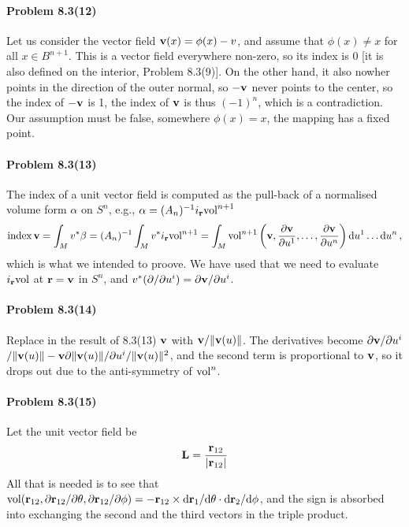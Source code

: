 \documentclass[a4paper,12pt]{article}
\def\d{\mathrm{d}}
\newcommand{\problem}[1]{\paragraph{Problem #1}}
\begin{document}

\problem{8.3(12)} Let us consider the vector field ${\bf v}(x)=\phi(x)-v$, and assume that $\phi(x)\ne x$ for all $x\in B^{n+1}$. This is a vector field everywhere non-zero, so its index is 0 [it is also defined on the interior, Problem 8.3(9)]. On the other hand, it also nowher points in the direction of the outer normal, so $-{\bf v}$ never points to the center, so the index of $-{\bf v}$ is 1, the index of ${\bf v}$ is thus $(-1)^n$, which is a contradiction. Our assumption must be false, somewhere $\phi(x)=x$, the mapping has a fixed point.


\problem{8.3(13)} The index of a unit vector field is computed as the pull-back of a normalised volume form $\alpha$ on $S^n$, e.g., $\alpha = (A_n)^{-1}i_{\bf r}{\rm vol}^{n+1}$
\[
 \mathop{\rm index} {\bf v} = \int_M v^* \beta = (A_n)^{-1}\int_M v^* i_{\bf r}{\rm vol}^{n+1} = \int_M {\rm vol}^{n+1}\left( {\bf v}, \frac{\partial\bf v}{\partial u^1}, \dots,\frac{\partial\bf v}{\partial u^n}\right)\d u^1\dots\d u^n\,,
\]
which is what we intended to proove. We have used that we need to evaluate $i_{\bf r}{\rm vol}$ at ${\bf r} = {\bf v}$ in $S^n$, and $v^*(\partial/\partial u^i) = {\partial\bf v}/\partial u^i$.


\problem{8.3(14)} Replace in the result of 8.3(13) ${\bf v}$ with ${\bf v}/\|{\bf v}(u)\|$. The derivatives become
$\partial {\bf v}/\partial u^i$ $/\|{\bf v}(u)\| - {\bf v}\partial \|{\bf v}(u)\|/\partial u^i / \|{\bf v}(u)\|^2$, and the second term is proportional to ${\bf v}$, so it drops out due to the anti-symmetry of ${\rm vol}^n$.


\problem{8.3(15)} Let the unit vector field be
\[
 {\bf L} = \frac{{\bf r}_{12}}{|{\bf r}_{12}|}
\]
All that is needed is to see that ${\rm vol}({\bf r}_{12}, \partial {\bf r}_{12}/\partial\theta, \partial{\bf r}_{12}/\partial\phi) = -{\bf r}_{12}\times \d {\bf r}_1/\d\theta \cdot \d {\bf r}_2/\d\phi$, and the sign is absorbed into exchanging the second and the third vectors in the triple product.

\end{document}
